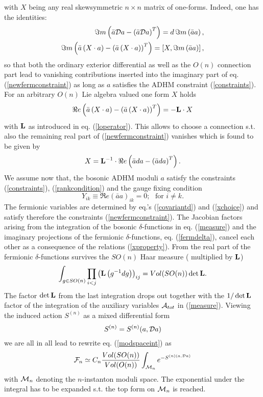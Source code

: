 \documentclass[a4paper,12pt]{article}
\begin{document}
with $X$ being any real skewsymmetric $n \times n$ matrix 
of one-forms. Indeed, one has the identities:     
\begin{eqnarray}
\Im m \left(\bar{a}{\cal D}a-\left(\bar{a}{\cal D}a\right)^T\right) 
=d \, \Im m \left(\bar{a}a\right), \nonumber \\ 
\Im m\left(\bar{a}\left(X\cdot a\right)-
\left(\bar{a}\left(X\cdot a\right)\right)^T \right) =
\left[X,\Im m \left(\bar{a}a\right)\right],
\label{xproperty}
\end{eqnarray}
so that both the ordinary exterior differential as well as 
the $O(n)$ connection part lead to vanishing contributions 
inserted into the imaginary part of eq. 
(\ref{newfermconstraint}) as long as $a$ satisfies the ADHM 
constraint (\ref{constraints}). For an arbitrary $O(n)$ Lie 
algebra valued one form $X$ holds 
\begin{equation}
\Re e \left(\bar{a}\left(X\cdot a\right)-
\left(\bar{a}\left(X\cdot a\right)\right)^T \right)=-{\bf L}\cdot X 
\nonumber 
\end{equation}
with ${\bf L}$ as introduced in eq. (\ref{loperator}). This allows 
to choose a connection s.t. also the remaining real part of 
(\ref{newfermconstraint}) vanishes which is found to be given by 
\begin{equation}
X={\bf L}^{-1}\cdot \Re e \left(\bar{a}da-
\left(\bar{a}da\right)^T\right).
\label{xchoice}
\end{equation}    
We assume now that, the bosonic ADHM moduli $a$ satisfy the 
constraints (\ref{constraints}), (\ref{rankcondition}) and the gauge 
fixing condition 
\begin{equation}
Y_{ik}\equiv \Re e \left(\bar{a}a\right)_{ik}= 0; \,\,\,\, \mbox{for} \, \, 
i\neq k. \nonumber 
\end{equation}
The fermionic variables are determined by eq.'s (\ref{covariantd}) and 
(\ref{xchoice}) and satisfy therefore the constraints 
(\ref{newfermconstraint}). The Jacobian factors arising from the 
integration of the bosonic $\delta$-functions in eq. (\ref{measure}) 
and the imaginary projections of the fermionic $\delta$-functions, eq. 
(\ref{fermdelta}), cancel each other as a consequence of the 
relations (\ref{xproperty}). From the real part of the fermionic 
$\delta$-functions survives the $SO(n)$ Haar measure (
multiplied by ${\bf L}$)
\[
\int_{g\in SO(n)}\prod_{i<j}\left({\bf L}\left(g^{-1}dg\right)\right)_{ij} 
=Vol(SO(n)) \det {\bf L}.
\]  
The factor $\det {\bf L}$ from the last integration drops out 
together with the $1/\det {\bf L}$ factor of the integration 
of the auxiliary variables ${\cal A}_{tot}$ in (\ref{measure}).
Viewing the induced action $S^{(n)}$ as a  mixed differential form 
\[ S^{(n)}=S^{(n)}(a,{\cal D}a) \]
we are all in all lead to rewrite eq. (\ref{modspaceint}) as 
\begin{equation}
{\cal F}_n\simeq C_n \frac{Vol(SO(n))}{Vol(O(n))}
\int_{{\cal M}_n} e^{-S^{(n)(a,{\cal D}a)}}
\label{newmodspaceint1}
\end{equation}         
with ${\cal M}_n$ denoting the $n$-instanton moduli space. The 
exponential under the integral has to be expanded s.t. the top 
form on ${\cal M}_n$ is reached. 
     
\end{document}
